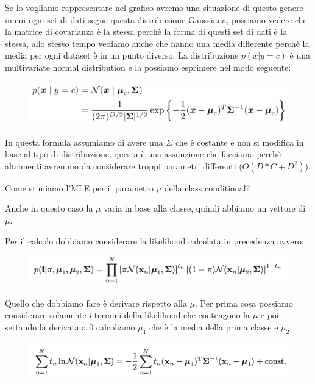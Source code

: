\documentclass[14pt]{extreport}
\begin{document}
Se lo vogliamo rappresentare nel grafico avremo una situazione di questo genere in cui ogni set di dati segue questa distribuzione Gaussiana, possiamo
vedere che la matrice di covarianza è la stessa perchè la forma di questi set di dati è la stessa, allo stesso tempo vediamo anche che hanno una media
differente perchè la media per ogni dataset è in un punto diverso. La distribuzione $p(x|y=c)$ è una multivariate normal distribution e la possiamo
esprimere nel modo seguente:

\begin{figure}[H]
\centering
\includegraphics[width=0.7\linewidth]{163.jpeg}
\end{figure}

In questa formula assumiamo di avere una $\Sigma$ che è costante e non si modifica in base al tipo di distribuzione, questa è una assunzione che
facciamo perchè altrimenti avremmo da considerare troppi parametri differenti ($O(D*C+D^2)$).

Come stimiamo l'MLE per il parametro $\mu$ della class conditional?

Anche in questo caso la $\mu$ varia in base alla classe, quindi abbiamo un vettore di $\mu$.

Per il calcolo dobbiamo considerare la likelihood calcolata in precedenza ovvero:

\begin{figure}[H]
\centering
\includegraphics[width=0.7\linewidth]{204.jpeg}
\end{figure}

Quello che dobbiamo fare è derivare rispetto alla $\mu$. Per prima cosa possiamo considerare solamente i termini della likelihood che contengono la
$\mu$ e poi settando la derivata a 0 calcoliamo $\mu_1$ che è la media della prima classe e $\mu_2$:

\begin{figure}[H]
\centering
\includegraphics[width=0.8\linewidth]{207.jpeg}
\end{figure}
\end{document}
